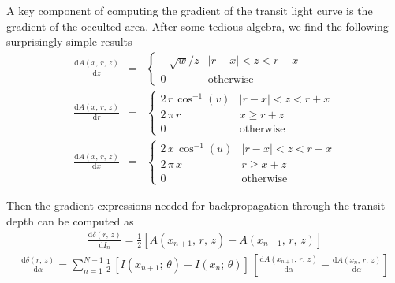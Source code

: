 \documentclass[modern]{aastex62}
\newcommand{\dd}{\ensuremath{ \mathrm{d}}}
\begin{document}
A key component of computing the gradient of the transit light curve is the
gradient of the occulted area.
After some tedious algebra, we find the following surprisingly simple results
\begin{eqnarray}
\frac{\dd A(x,\,r,\,z)}{\dd z} &=& \left\{\begin{array}{ll}
-\sqrt{w}/z &
    \left|r-x\right| < z < r + x \\
0 & \mathrm{otherwise}
\end{array}\right.\\
\frac{\dd A(x,\,r,\,z)}{\dd r} &=& \left\{\begin{array}{ll}
2\,r\,\cos^{-1}(v) & \left|r-x\right| < z < r + x \\
2\,\pi\,r & x \ge r + z \\
0 & \mathrm{otherwise}
\end{array}\right.\\
\frac{\dd A(x,\,r,\,z)}{\dd x} &=& \left\{\begin{array}{ll}
2\,x\,\cos^{-1}(u) & \left|r-x\right| < z < r + x \\
2\,\pi\,x & r \ge x + z \\
0 & \mathrm{otherwise}
\end{array}\right.
\end{eqnarray}

Then the gradient expressions needed for backpropagation through the transit
depth can be computed as
\begin{eqnarray}
\frac{\dd \delta(r,\,z)}{\dd I_n} = \frac{1}{2}
    \left[A(x_{n+1},\,r,\,z) - A(x_{n-1},\,r,\,z)\right]
\end{eqnarray}
\begin{eqnarray}
\frac{\dd \delta(r,\,z)}{\dd \alpha} = \sum_{n=1}^{N-1} \frac{1}{2}\,\left[
I(x_{n+1};\,\theta) + I(x_n;\,\theta)\right]\,
\left[\frac{\dd A(x_{n+1},\,r,\,z)}{\dd\alpha} -
\frac{\dd A(x_n,\,r,\,z)}{\dd \alpha}\right]
\end{eqnarray}




\end{document}
